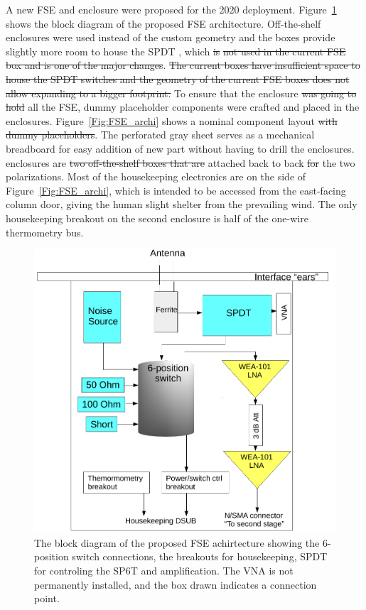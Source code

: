 A new FSE and enclosure were proposed for the 2020 deployment. Figure~\ref{Fig:FSE_rev} shows the block diagram of the proposed FSE architecture. Off-the-shelf enclosures were used instead of the custom geometry  and the boxes provide slightly more room to house the SPDT , which \st{is}  \st{not used in the current FSE box and is one of the major changes}. \st{The current boxes have insufficient space to house the SPDT switches and the geometry of the current FSE boxes does not allow expanding to a bigger footprint.}  To ensure that the enclosure \st{was going to hold}  all the FSE, dummy placeholder components were crafted and placed in the enclosures. Figure~\ref{Fig:FSE_archi} shows a nominal component layout \st{with dummy placeholders}. The perforated gray sheet serves as a mechanical breadboard for easy addition of new part without having to drill the enclosures.  enclosures are \st{two off-the-shelf boxes that are} attached back to back \st{for}  the two polarizations. Most of the housekeeping electronics are on the side of Figure~\ref{Fig:FSE_archi}, which is intended to be accessed from the east-facing column door, giving the human slight shelter from the prevailing wind. The only housekeeping breakout on the second enclosure is half of the one-wire thermometry bus.

\begin{figure}
	\centering
	\includegraphics[width=0.7\linewidth]{Figures/FSE_rev}
	\caption{The block diagram of the proposed FSE achirtecture showing the 6-position switch connections, the breakouts for housekeeping, SPDT for controling the SP6T and amplification. The VNA is not permanently installed, and the box drawn indicates a connection point.}
	\label{Fig:FSE_rev}
\end{figure} 

